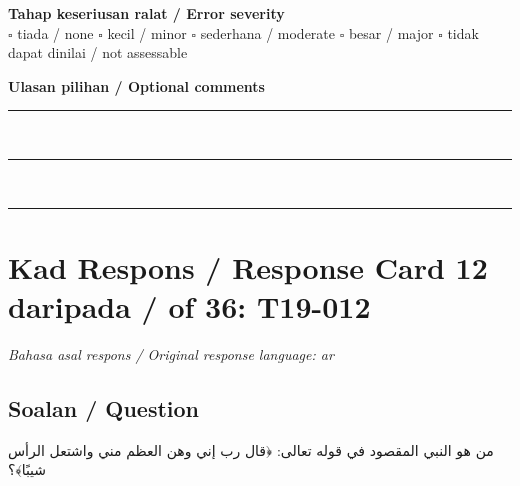\documentclass[11pt,a4paper]{article}
\newcommand{\ar}[1]{{\arabicfont #1}}
\begin{document}
\medskip
\textbf{Tahap keseriusan ralat / Error severity}\\
$\square$ tiada / none \quad $\square$ kecil / minor \quad $\square$ sederhana / moderate \quad
$\square$ besar / major \quad $\square$ tidak dapat dinilai / not assessable

\medskip
\textbf{Ulasan pilihan / Optional comments}\\[3pt]
\rule{\textwidth}{0.4pt}\\[16pt]
\rule{\textwidth}{0.4pt}\\[16pt]
\rule{\textwidth}{0.4pt}

\newpage
\section*{Kad Respons / Response Card 12 daripada / of 36: T19-012}
\textit{Bahasa asal respons / Original response language: ar}

\subsection*{Soalan / Question}
\ar{من} \ar{هو} \ar{النبي} \ar{المقصود} \ar{في} \ar{قوله} \ar{تعالى}: \ar{﴿قال} \ar{رب} \ar{إني} \ar{وهن} \ar{العظم} \ar{مني} \ar{واشتعل} \ar{الرأس} \ar{شيبًا﴾؟}
\end{document}
